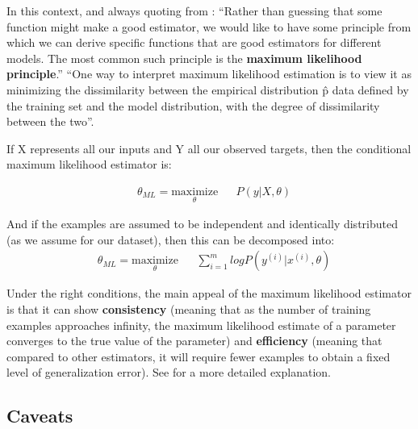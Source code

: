 In this context, and always quoting from \cite[p.131]{goodfellow}: ``Rather than guessing that some function might make a good estimator, we would like to have some principle from which we can derive specific functions that are good estimators for different models. The most common such principle is the \textbf{maximum likelihood principle}.''
``One way to interpret maximum likelihood estimation is to view it as minimizing the dissimilarity between the empirical distribution p̂ data defined by the training set and the model distribution, with the degree of dissimilarity between the two''.

If X represents all our inputs and Y all our observed targets, then the conditional maximum likelihood estimator is:

\begin{equation*}
  \begin{aligned}
    & \theta_{ML} = \underset{\theta}{\text{maximize}}
    & & P(y | X, \theta)
  \end{aligned}
\end{equation*}

And if the examples are assumed to be independent and identically distributed (as we assume for our dataset), then this can be decomposed into:
\begin{equation*}
  \begin{aligned}
    & \theta_{ML} = \underset{\theta}{\text{maximize}}
    & & \sum_{i=1}^m log P(y^{(i)} | x^{(i)}, \theta)
  \end{aligned}
\end{equation*}


Under the right conditions, the main appeal of the maximum likelihood estimator is that it can show \textbf{consistency} (meaning that as the number of training examples approaches infinity, the maximum likelihood estimate of a parameter converges to the true value of the parameter) and \textbf{efficiency} (meaning that compared to other estimators, it will require fewer examples to obtain a fixed level of generalization error). See \cite[p.134]{goodfellow} for a more detailed explanation.


\subsection{Caveats}

